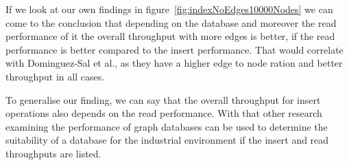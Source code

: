 If we look at our own findings in figure~\ref{fig:indexNoEdges10000Nodes} we can come to the conclusion that depending on the database and moreover the read performance of it the overall throughput with more edges is better,
if the read performance is better compared to the insert performance.
That would correlate with Dominguez-Sal et al.\cite{TaoShen},
as they have a higher edge to node ration and better throughput in all cases.

To generalise our finding,
we can say that the overall throughput for insert operations also depends on the read performance.
With that other research examining the performance of graph databases can be used to determine the suitability of a database for the industrial environment if the insert and read throughputs are listed.
